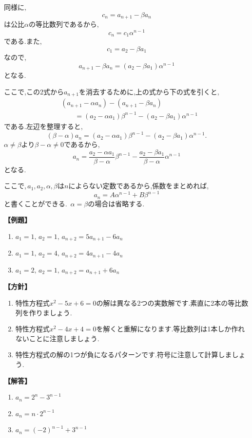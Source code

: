     同様に,
    \[
      c_n=a_{n+1}-\beta a_n
    \]
    は公比$\alpha$の等比数列であるから,
    \[
      c_n=c_1\alpha^{n-1}
    \]
    である.また,
    \[
      c_1=a_2-\beta a_1
    \]
    なので,
    \[
      a_{n+1}-\beta a_n
      =(a_2-\beta a_1)\alpha^{n-1}
    \]
    となる.

    ここで,この2式から$a_{n+1}$を消去するために,上の式から下の式を引くと,
    \begin{align*}
      &(a_{n+1}-\alpha a_n)-(a_{n+1}-\beta a_n)\\
      &\qquad=(a_2-\alpha a_1)\beta^{n-1}
      -(a_2-\beta a_1)\alpha^{n-1}
    \end{align*}
    である.左辺を整理すると,
    \[
      (\beta-\alpha)a_n
      =(a_2-\alpha a_1)\beta^{n-1}
      -(a_2-\beta a_1)\alpha^{n-1}.
    \]
    $\alpha\ne\beta$より$\beta-\alpha\ne0$であるから,
    \[
      a_n
      =\frac{a_2-\alpha a_1}{\beta-\alpha}\beta^{n-1}
      -\frac{a_2-\beta a_1}{\beta-\alpha}\alpha^{n-1}
    \]
    となる.

    ここで,\,$a_1,a_2,\alpha,\beta$は$n$によらない定数であるから,係数をまとめれば,
    \[
      a_n=A\alpha^{n-1}+B\beta^{n-1}
    \]
    と書くことができる.
    \,$\alpha=\beta$の場合は省略する.

    \noindent \textbf{【例題】}
    \begin{enumerate}[label=(\arabic*),parsep=3pt]
      \item $\displaystyle a_1=1,\,a_2=1,\, a_{n+2}=5a_{n+1}-6a_n$
      \item $\displaystyle a_1=1,\,a_2=4,\, a_{n+2}=4a_{n+1}-4a_n$
      \item $\displaystyle a_1=2,\,a_2=1,\, a_{n+2}=a_{n+1}+6a_n$
    \end{enumerate}

    \noindent\textbf{【方針】}
    \begin{enumerate}[label=(\arabic*),parsep=3pt]
      \item 特性方程式$x^2-5x+6=0$の解は異なる2つの実数解です.素直に2本の等比数列を作りましょう.
      \item 特性方程式$x^2-4x+4=0$を解くと重解になります.等比数列は1本しか作れないことに注意しましょう.
      \item 特性方程式の解の1つが負になるパターンです.符号に注意して計算しましょう.
    \end{enumerate}

    \noindent\textbf{【解答】}
    \begin{enumerate}[label=(\arabic*),parsep=3pt]
      \item $\displaystyle a_n=2^n-3^{n-1}$
      \item $\displaystyle a_n=n\cdot2^{n-1}$
      \item $\displaystyle a_n=(-2)^{n-1}+3^{n-1}$
    \end{enumerate}

